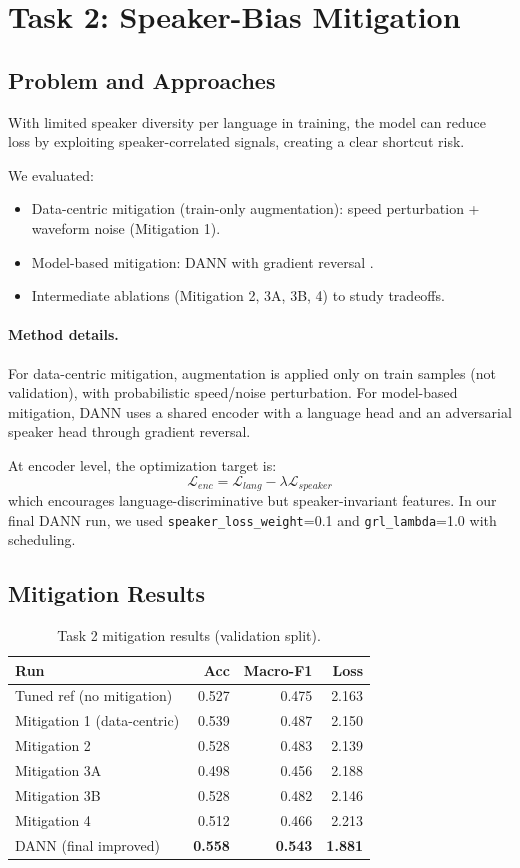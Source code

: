 \documentclass[11pt]{article}
\begin{document}
\section{Task 2: Speaker-Bias Mitigation}
\subsection{Problem and Approaches}
With limited speaker diversity per language in training, the model can reduce loss by exploiting speaker-correlated signals, creating a clear shortcut risk.

We evaluated:
\begin{itemize}
    \item Data-centric mitigation (train-only augmentation): speed perturbation + waveform noise (Mitigation 1).
    \item Model-based mitigation: DANN with gradient reversal \citep{ganin2016dann}.
    \item Intermediate ablations (Mitigation 2, 3A, 3B, 4) to study tradeoffs.
\end{itemize}

\paragraph{Method details.}
For data-centric mitigation, augmentation is applied only on train samples (not validation), with probabilistic speed/noise perturbation. For model-based mitigation, DANN uses a shared encoder with a language head and an adversarial speaker head through gradient reversal.

At encoder level, the optimization target is:
\[
\mathcal{L}_{enc} = \mathcal{L}_{lang} - \lambda \mathcal{L}_{speaker}
\]
which encourages language-discriminative but speaker-invariant features. In our final DANN run, we used \texttt{speaker\_loss\_weight}=0.1 and \texttt{grl\_lambda}=1.0 with scheduling.

\subsection{Mitigation Results}
\begin{table}[t]
\centering
\small
\setlength{\tabcolsep}{2.5pt}
\begin{tabular}{@{}p{}rrr@{}}
\toprule
Run & Acc & Macro-F1 & Loss \\
\midrule
Tuned ref (no mitigation) & 0.527 & 0.475 & 2.163 \\
Mitigation 1 (data-centric) & 0.539 & 0.487 & 2.150 \\
Mitigation 2 & 0.528 & 0.483 & 2.139 \\
Mitigation 3A & 0.498 & 0.456 & 2.188 \\
Mitigation 3B & 0.528 & 0.482 & 2.146 \\
Mitigation 4 & 0.512 & 0.466 & 2.213 \\
DANN (final improved) & \textbf{0.558} & \textbf{0.543} & \textbf{1.881} \\
\bottomrule
\end{tabular}
\caption{Task 2 mitigation results (validation split).}
\label{tab:task2-mitigation}
\end{table}
\end{document}
